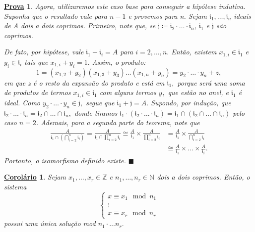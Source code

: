 \documentclass{article}
\newtheorem*{proof*}{\underline{Prova}}
\newtheorem*{crl*}{\underline{Corolário}}
\renewcommand\qedsymbol{$\blacksquare$}
\begin{document}
\begin{proof*}
  Agora, utilizaremos este caso base para conseguir a hipótese indutiva. Suponha que o resultado vale para \(n-1\) e provemos para n.
  Sejam \(\mathfrak{i}_{1}, \dotsc, \mathfrak{i}_{n}\) ideais de A dois a dois coprimos. Primeiro, note que,
  se \(\mathfrak{j}\coloneqq \mathfrak{i}_{2}\cdot \dotsc \cdot \mathfrak{i}_{n}\), \(\mathfrak{i}_{1}\) e \(\mathfrak{j}\) são coprimos.

  De fato, por hipótese, vale \(\mathfrak{i}_{1}+\mathfrak{i}_{i} = A\) para \(i=2, \dotsc, n.\) Então, existem
  \(x_{1, i}\in \mathfrak{i}_{1}\) e \(y_{i}\in \mathfrak{i}_{i}\) tais que \(x_{1, i}+y_{i} = 1.\) Assim, o produto:
  \[
    1 = (x_{1, 2} + y_{2})(x_{1, 3}+y_{3})\dotsc(x_{1, n}+y_{n}) = y_{2}\cdot \dotsc \cdot y_{n}+z,
  \]
  em que z é o resto da expansão do produto e está em \(\mathfrak{i}_{1},\) porque será uma soma de produtos de termos \(x_{1, i}\in \mathfrak{i}_{1}\) com alguns 
  termos \(y_{},\) que estão no anel, e \(\mathfrak{i}_{1}\) é ideal. Como \(y_{2}\cdot \dotsc \cdot y_{n}\in \mathfrak{j},\) segue que  \(\mathfrak{i}_{1} + \mathfrak{j} = A.\)
  Supondo, por indução, que \(\mathfrak{i}_{2}\cdot \dotsc \cdot \mathfrak{i}_{n} = \mathfrak{i}_{2}\cap \dotsc \cap \mathfrak{i}_{n},\) donde tiramos
  \(\mathfrak{i}_{1}\cdot (\mathfrak{i}_{2}\cdot \dotsc \cdot \mathfrak{i}_{n}) = \mathfrak{i}_{1}\cap (\mathfrak{i}_{2}\cap \dotsc\cap \mathfrak{i}_{n})\) pelo caso \(n=2\).
  Ademais, para a segunda parte do teorema, note que 
  \begin{align*}
    \frac{A}{\mathfrak{i}_{1}\cap(\bigcap_{i=2}^{n}\mathfrak{i}_{i})} = \frac{A}{\mathfrak{i}_{1}\cap \prod\limits_{i=2}^{n}\mathfrak{i}_{i}}\cong \frac{A}{\mathfrak{i}_{1}}\times \frac{A}{\prod\limits_{i=2}^{n}\mathfrak{i}_{i}}&=\frac{A}{\mathfrak{i}_{1}}\times \frac{A}{\bigcap_{i=2}^{n}\mathfrak{i}_{i}}\\  
                                                                                                                                                                                                                                    &\cong \frac{A}{\mathfrak{i}_{1}}\times \dotsc\times \frac{A}{\mathfrak{i}_{i}}.
  \end{align*}
  Portanto, o isomorfismo definido existe. \qedsymbol
\end{proof*}
\begin{crl*}
  Sejam \(x_{1}, \dotsc, x_{r}\in \mathbb{Z}\) e \(n_{1}, \dotsc, n_{r}\in \mathbb{N}\) dois a dois coprimos. Então,
  o sistema 
  \begin{equation*}
    \left\{\begin{array}{ll}
        x\equiv x_{1}\mod n_{1}\\
        \vdots\\
        x\equiv x_{r}\mod n_{r}
    \end{array}\right.
  \end{equation*}
  possui uma única solução mod \(n_{1}\cdot \dotsc n_{r}.\)
\end{crl*}
\end{document}
